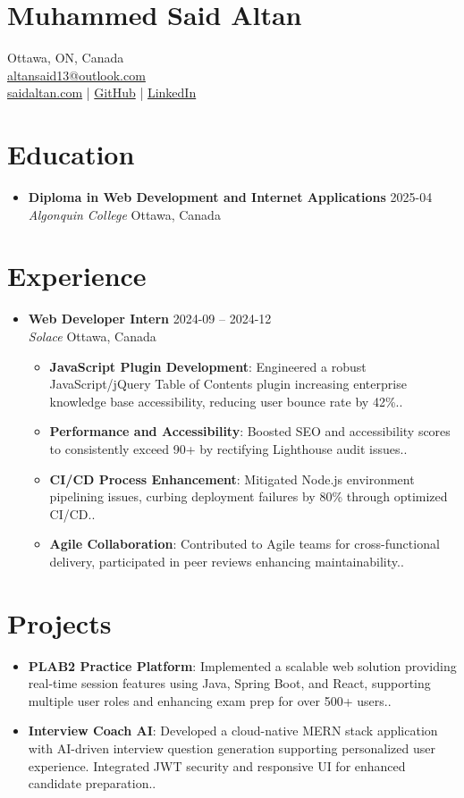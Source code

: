 \documentclass[letterpaper, 10pt]{article}
\newcommand{\resumeItem}[2]{\item\small{\textbf{#1}: #2.}}
\newcommand{\resumeSubheading}[4]{
  \vspace{-1pt}\item \small{
    \textbf{#1} \hfill #2 \\
    \textit{#3} \hfill #4
  }\vspace{-1pt}
}
\newcommand{\resumeSubItem}[2]{\resumeItem{#1}{#2}\vspace{-7pt}}
\newcommand{\resumeSubHeadingListStart}{\begin{itemize}[leftmargin=0.5cm]}
\newcommand{\resumeSubHeadingListEnd}{\end{itemize}}
\newcommand{\resumeItemListStart}{\begin{itemize}}
\newcommand{\resumeItemListEnd}{\end{itemize}\vspace{-5pt}}
\begin{document}
\section{\textbf{Muhammed Said Altan}}
\hfill Ottawa, ON, Canada \\
\hfill \href{mailto:altansaid13@outlook.com}{altansaid13@outlook.com} \\
\hfill \href{https://saidaltan.com}{saidaltan.com} | \href{https://github.com/altansaid}{GitHub} | \href{https://linkedin.com/in/saidaltan}{LinkedIn}

\section{Education}
\resumeSubHeadingListStart
\resumeSubheading
{Diploma in Web Development and Internet Applications}{2025-04}
{Algonquin College}{Ottawa, Canada}
\resumeSubHeadingListEnd

\section{Experience}
\resumeSubHeadingListStart
\resumeSubheading
{Web Developer Intern}{2024-09 -- 2024-12}
{Solace}{Ottawa, Canada}
\resumeItemListStart
\resumeItem{JavaScript Plugin Development}
{Engineered a robust JavaScript/jQuery Table of Contents plugin increasing enterprise knowledge base accessibility, reducing user bounce rate by 42\%.}
\resumeItem{Performance and Accessibility}
{Boosted SEO and accessibility scores to consistently exceed 90+ by rectifying Lighthouse audit issues.}
\resumeItem{CI/CD Process Enhancement}
{Mitigated Node.js environment pipelining issues, curbing deployment failures by 80\% through optimized CI/CD.}
\resumeItem{Agile Collaboration}
{Contributed to Agile teams for cross-functional delivery, participated in peer reviews enhancing maintainability.}
\resumeItemListEnd
\resumeSubHeadingListEnd

\section{Projects}
\resumeSubHeadingListStart
\resumeSubItem{PLAB2 Practice Platform}
{Implemented a scalable web solution providing real-time session features using Java, Spring Boot, and React, supporting multiple user roles and enhancing exam prep for over 500+ users.}
\resumeSubItem{Interview Coach AI}
{Developed a cloud-native MERN stack application with AI-driven interview question generation supporting personalized user experience. Integrated JWT security and responsive UI for enhanced candidate preparation.}
\resumeSubHeadingListEnd
\end{document}
